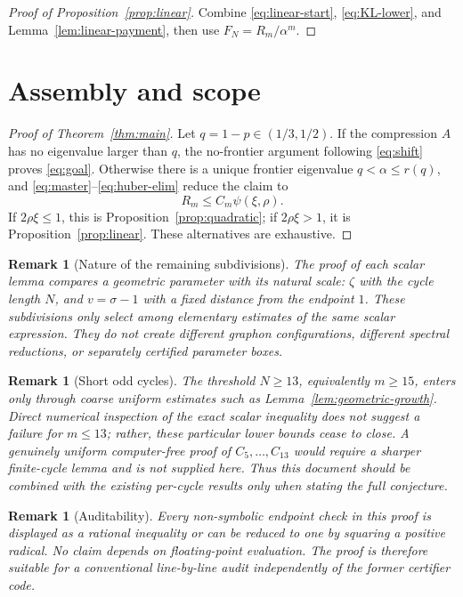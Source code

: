 \documentclass[11pt]{article}
\newtheorem{remark}[theorem]{Remark}
\begin{document}
\begin{proof}[Proof of Proposition~\ref{prop:linear}]
Combine \eqref{eq:linear-start}, \eqref{eq:KL-lower}, and
Lemma~\ref{lem:linear-payment}, then use $F_N=R_m/\alpha^m$.
\end{proof}

\section{Assembly and scope}\label{sec:assembly}

\begin{proof}[Proof of Theorem~\ref{thm:main}]
Let $q=1-p\in(1/3,1/2)$.  If the compression $A$ has no eigenvalue larger
than $q$, the no-frontier argument following \eqref{eq:shift} proves
\eqref{eq:goal}.  Otherwise there is a unique frontier eigenvalue
$q<\alpha\le r(q)$, and \eqref{eq:master}--\eqref{eq:huber-elim} reduce the
claim to
\[
        R_m\le C_m\psi(\xi,\rho).
\]
If $2\rho\xi\le1$, this is Proposition~\ref{prop:quadratic}; if
$2\rho\xi>1$, it is Proposition~\ref{prop:linear}.  These alternatives are
exhaustive.
\end{proof}

\begin{remark}[Nature of the remaining subdivisions]
The proof of each scalar lemma compares a geometric parameter with its
natural scale: $\zeta$ with the cycle length $N$, and $v=\sigma-1$ with a
fixed distance from the endpoint $1$.  These subdivisions only select among
elementary estimates of the same scalar expression.  They do not create
different graphon configurations, different spectral reductions, or
separately certified parameter boxes.
\end{remark}

\begin{remark}[Short odd cycles]
The threshold $N\ge13$, equivalently $m\ge15$, enters only through coarse
uniform estimates such as Lemma~\ref{lem:geometric-growth}.  Direct numerical
inspection of the exact scalar inequality does not suggest a failure for
$m\le13$; rather, these particular lower bounds cease to close.  A genuinely
uniform computer-free proof of $C_5,\ldots,C_{13}$ would require a sharper
finite-cycle lemma and is not supplied here.  Thus this document should be
combined with the existing per-cycle results only when stating the full
conjecture.
\end{remark}

\begin{remark}[Auditability]
Every non-symbolic endpoint check in this proof is displayed as a rational
inequality or can be reduced to one by squaring a positive radical.  No claim
depends on floating-point evaluation.  The proof is therefore suitable for a
conventional line-by-line audit independently of the former certifier code.
\end{remark}
\end{document}
